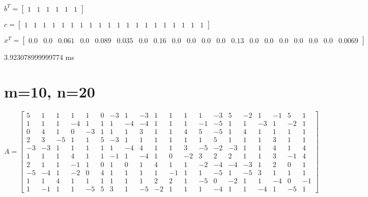 \documentclass[8pt]{article}
\begin{document}
$ b^T =
\begin{bmatrix}
  1  &  1  &  1  &  1  &  1  &  1 
\end{bmatrix}
$


$ c =
\begin{bmatrix}
  1  &  1  &  1  &  1  &  1  &  1  &  1  &  1  &  1  &  1  &  1  &  1  &  1  &  1  &  1  &  1  &  1  &  1  &  1  &  1 
\end{bmatrix}
$


$ x^T =
\begin{bmatrix}
  0.0 &  0.0 &  0.061 &  0.0 &  0.089 &  0.035 &  0.0 &  0.16 &  0.0 &  0.0 &  0.0 &  0.0 &  0.13 &  0.0 &  0.0 &  0.0 &  0.0 &  0.0 &  0.0 &  0.0069
\end{bmatrix}
$


3.923078999999774  ms


\section{ m=10, n=20 }



$ A =
\begin{bmatrix}
  5  &  1  &  1  &  1  &  1  &  0  & -3  &  1  & -3  &  1  &  1  &  1  &  1  & -3  &  5  & -2  &  1  & -1  &  5  &  1 \\
  1  &  1  &  1  & -4  &  1  &  1  &  1  & -4  & -4  &  1  &  1  &  1  & -1  & -5  &  1  &  1  & -3  &  1  & -2  &  1 \\
  0  &  4  &  1  &  0  & -3  &  1  &  1  &  1  &  3  &  1  &  1  &  4  &  5  & -5  &  1  &  4  &  1  &  1  &  1  &  1 \\
  2  &  3  & -5  &  1  &  1  &  5  & -3  &  1  &  1  &  1  &  1  &  1  &  1  &  5  &  1  &  1  &  1  &  3  &  1  &  1 \\
 -3  & -3  &  1  &  1  &  1  &  1  &  1  & -4  &  4  &  1  &  1  &  3  & -5  & -2  & -3  &  1  &  1  &  4  &  1  &  4 \\
  1  &  1  &  1  &  4  &  1  &  1  & -1  &  1  & -4  &  1  &  0  & -2  &  3  &  2  &  2  &  1  &  1  &  3  & -1  &  4 \\
  2  &  1  &  1  & -1  &  1  &  0  &  1  &  0  &  1  &  4  &  1  &  1  & -2  & -4  & -4  & -3  &  1  &  2  &  0  &  1 \\
 -5  & -4  &  1  & -2  &  0  &  4  &  1  &  1  &  1  &  1  & -1  &  1  &  1  & -5  &  1  & -5  &  3  &  1  &  1  &  1 \\
  1  &  1  &  4  &  1  &  1  &  1  &  1  &  1  &  1  &  2  &  2  &  1  & -5  &  0  & -2  &  1  &  1  & -4  &  0  & -1 \\
  1  & -1  &  1  &  1  & -5  &  5  &  3  &  1  & -5  & -2  &  1  &  1  &  1  & -4  &  1  &  1  & -4  &  1  & -5  &  1 
\end{bmatrix}
$
\end{document}
